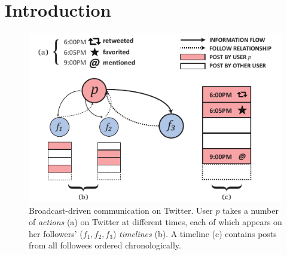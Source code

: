 \documentclass[onecolumn, 12 pt, doublespace, fullpage, letterpaper]{report}
\begin{document}
%

\begin{onehalfspacing}%
\renewcommand{\contentsname}{\centerline{TABLE OF CONTENTS}}
\tableofcontents
\cleardoublepage


\cleardoublepage
{}
\renewcommand*\listfigurename{\centerline{LIST OF FIGURES}}
\listoffigures

\cleardoublepage
{}
\renewcommand*\listtablename{\centerline{LIST OF TABLES}}
\listoftables

\end{onehalfspacing}

% 
% 
% 
% 
% 
% 

\chapter{Introduction}

\begin{figure}%
  \includegraphics[width=\linewidth]{broadcasts}
  \caption[Broadcast-driven communication on Twitter.]{Broadcast-driven communication on Twitter. User $p$ takes a number of \textit{actions} (a) on Twitter at different times, each of which appears on her followers' ($f_1, f_2, f_3$) \textit{timelines} (b). A timeline (c) contains posts from all followees ordered chronologically.}
  \label{fig:broadcasts}
\end{figure}
\end{document}
